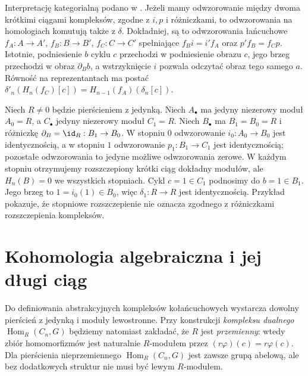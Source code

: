 \begin{uwaga}
\label{uwaga:les-naturalnosc}
Interpretację kategorialną podano w .
Jeżeli mamy odwzorowanie między dwoma krótkimi
ciągami kompleksów, zgodne z $i,p$ i
różniczkami, to odwzorowania na homologiach
komutują także z $\delta$.
Dokładniej, są to odwzorowania łańcuchowe
$f_A:A\to A'$, $f_B:B\to B'$, $f_C:C\to C'$ spełniające
$f_Bi=i'f_A$ oraz $p'f_B=f_Cp$.
Istotnie, podniesienie $b$ cyklu $c$ przechodzi
w podniesienie obrazu $c$, jego brzeg przechodzi
w obraz $\partial_Bb$, a wstrzyknięcie $i$
pozwala odczytać obraz tego samego $a$.
Równość na reprezentantach ma postać
$\delta'_n(H_n(f_C)[c])
=H_{n-1}(f_A)(\delta_n[c])$.
\end{uwaga}

\begin{przyklad}
\label{prz:delta-izomorfizm}
Niech $R\ne0$ będzie pierścieniem z jedynką.
Niech $A_\bullet$ ma jedyny niezerowy moduł
$A_0=R$, a $C_\bullet$ jedyny niezerowy
moduł $C_1=R$. Niech $B_\bullet$ ma
$B_1=B_0=R$ i różniczkę
$\partial_B=\id_R:B_1\to B_0$.
W stopniu $0$ odwzorowanie $i_0:A_0\to B_0$
jest identycznością, a w stopniu $1$
odwzorowanie $p_1:B_1\to C_1$ jest identycznością;
pozostałe odwzorowania to jedyne możliwe odwzorowania zerowe.
W każdym stopniu otrzymujemy rozszczepiony
krótki ciąg dokładny modułów, ale
$H_n(B)=0$ we wszystkich stopniach.
Cykl $c=1\in C_1$ podnosimy do $b=1\in B_1$.
Jego brzeg to $1=i_0(1)\in B_0$,
więc $\delta_1:R\to R$ jest identycznością.
Przykład pokazuje, że stopniowe rozszczepienie
nie oznacza zgodnego z różniczkami
rozszczepienia kompleksów.
\end{przyklad}
\section{Kohomologia algebraiczna i jej długi ciąg}
\label{sec:kohomologia-algebraiczna}

Do definiowania abstrakcyjnych kompleksów kołańcuchowych
wystarcza dowolny pierścień z jedynką i moduły lewostronne.
Przy konstrukcji \emph{kompleksu dualnego}
$\operatorname{Hom}_R(C_n,G)$ będziemy natomiast zakładać,
że $R$ jest \emph{przemienny}: wtedy zbiór homomorfizmów
jest naturalnie $R$-modułem przez
$(r\varphi)(c)=r\varphi(c)$. Dla pierścienia nieprzemiennego
$\operatorname{Hom}_R(C_n,G)$ jest zawsze grupą abelową,
ale bez dodatkowych struktur nie musi być lewym $R$-modułem.

